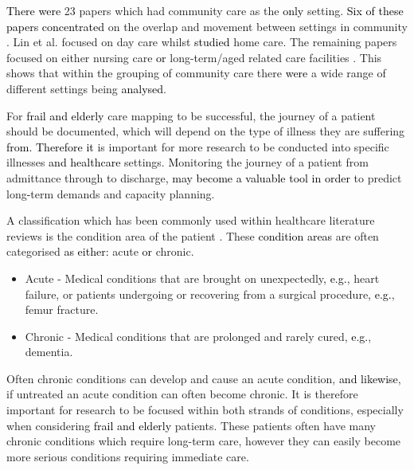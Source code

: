 \documentclass[../thesis.tex]{subfiles}
\begin{document}
\textcolor{black}{There were} 23 papers which had community care as the \textcolor{black}{only} setting.  \textcolor{black}{Six of these papers concentrated} on the overlap and movement between settings in community \cite{Bae, Gassoumis, YLi,Bidhandi,Welberry, Zhang1}. Lin et al. \cite{Lin} focused on day care whilst \cite{Eveborn, Grenouilleau, Guo, Yalcindag} \textcolor{black}{studied} home care. The remaining papers focused on either nursing care \cite{Arling,Borowiak, Muramatsu} \textcolor{black}{or} long-term/aged related care facilities \cite{Ambagtsheer, Arvelo, Cepoiu, Desai, Eggink, Katsaliaki, Kerpershoek, Tao, Xie}. This shows that within the grouping of community care there \textcolor{black}{were} a wide range of different settings being \textcolor{black}{analysed}.


For \textcolor{black}{frail and elderly} care mapping to be successful, the journey of a patient should be documented, which will depend on the type of illness they are suffering \textcolor{black}{from. Therefore it} is important for more research to be conducted into specific illnesses \textcolor{black}{and healthcare} settings. \textcolor{black}{M}onitoring the journey of a patient from admittance through to discharge\textcolor{black}{, may become a valuable tool in order} to predict long\textcolor{black}{-}term demands and capacity planning.

A classification which has been commonly used within healthcare literature reviews is the condition area of the patient \cite{Aspland,YZhang}. These \textcolor{black}{condition areas} are often categorised \textcolor{black}{as either:} acute \textcolor{black}{or} chronic.

\begin{itemize}
    \item Acute - Medical conditions that are brought on unexpectedly\textcolor{black}{, e.g.}, heart failure, or patients undergoing or recovering from a surgical procedure\textcolor{black}{, e.g.}, femur fracture.
    \item Chronic - Medical conditions that are prolonged and rarely cured, \textcolor{black}{e.g.}, dementia.
\end{itemize}

Often chronic conditions can develop and cause an acute condition, \textcolor{black}{and likewise}, if untreated an acute condition can often become chronic. It is therefore important for research to be focused within both strands of conditions, especially when considering \textcolor{black}{frail and elderly} patients. These patients often have many chronic conditions which require long-term care, however they can easily become more serious conditions requiring immediate care.
\end{document}
